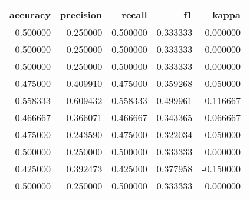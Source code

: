 \begin{tabular}{rrrrr}
\toprule
accuracy & precision & recall & f1 & kappa \\
\midrule
0.500000 & 0.250000 & 0.500000 & 0.333333 & 0.000000 \\
0.500000 & 0.250000 & 0.500000 & 0.333333 & 0.000000 \\
0.500000 & 0.250000 & 0.500000 & 0.333333 & 0.000000 \\
0.475000 & 0.409910 & 0.475000 & 0.359268 & -0.050000 \\
0.558333 & 0.609432 & 0.558333 & 0.499961 & 0.116667 \\
0.466667 & 0.366071 & 0.466667 & 0.343365 & -0.066667 \\
0.475000 & 0.243590 & 0.475000 & 0.322034 & -0.050000 \\
0.500000 & 0.250000 & 0.500000 & 0.333333 & 0.000000 \\
0.425000 & 0.392473 & 0.425000 & 0.377958 & -0.150000 \\
0.500000 & 0.250000 & 0.500000 & 0.333333 & 0.000000 \\
\bottomrule
\end{tabular}
